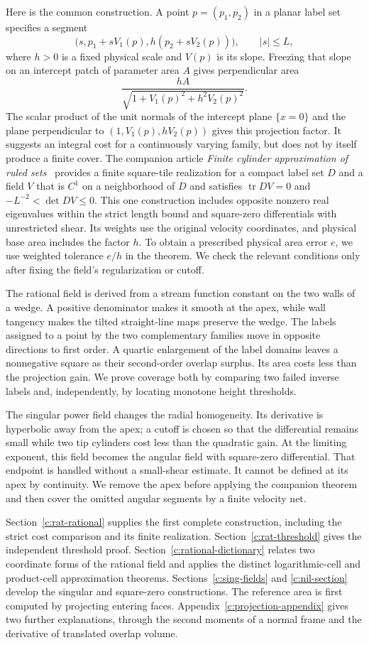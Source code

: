 Here is the common construction. A point $p=(p_1,p_2)$ in a planar
label set specifies a segment
\[
 \bigl(s,p_1+sV_1(p),h(p_2+sV_2(p))\bigr),\qquad |s|\le L,
\]
where $h>0$ is a fixed physical scale and $V(p)$ is its slope.
Freezing that slope on an intercept patch of parameter area $A$
gives perpendicular area
\[
 \frac{hA}{\sqrt{1+V_1(p)^2+h^2V_2(p)^2}}.
\]
The scalar product of the unit normals of the intercept plane
$\{x=0\}$ and the plane perpendicular to $(1,V_1(p),hV_2(p))$
gives this projection factor. It suggests an integral cost for a continuously
varying family, but does not by itself produce a finite cover.
The companion article \emph{Finite cylinder approximation of ruled
sets}~\cite[Theorem~1.2]{RuledApproximation2026} provides a finite
square-tile realization for a compact label set $D$ and a field $V$
that is $C^1$ on a neighborhood of $D$ and satisfies
$\operatorname{tr}DV=0$ and $-L^{-2}<\det DV\le0$.
This one construction includes opposite nonzero real eigenvalues
within the strict length bound and square-zero differentials with
unrestricted shear. Its weights use the original velocity coordinates,
and physical base area includes the factor $h$. To obtain a prescribed
physical area error $e$, we use weighted tolerance $e/h$ in the theorem.
We check the relevant conditions only after fixing the field's
regularization or cutoff.

The rational field is derived from a stream function constant on the
two walls of a wedge. A positive denominator makes it smooth at the
apex, while wall tangency makes the tilted straight-line maps preserve
the wedge. The labels assigned to a point by the two complementary
families move in opposite directions to first order. A quartic
enlargement of the label domains leaves a nonnegative square as their
second-order overlap surplus. Its area costs less than the projection
gain. We prove coverage both by comparing two failed inverse labels
and, independently, by locating monotone height thresholds.

The singular power field changes the radial homogeneity. Its derivative
is hyperbolic away from the apex; a cutoff is chosen so that the
differential remains small while two tip cylinders cost less than the
quadratic gain. At the limiting exponent, this field becomes the angular
field with square-zero differential. That endpoint is handled without
a small-shear estimate. It cannot be defined at its apex
by continuity. We remove the apex before applying the companion
theorem and then cover the omitted angular segments by a finite
velocity net.

Section~\ref{c:rat-rational} supplies the first complete construction,
including the strict cost comparison and its finite realization.
Section~\ref{c:rat-threshold} gives the independent threshold proof.
Section~\ref{c:rational-dictionary} relates two coordinate forms of the
rational field and applies the distinct logarithmic-cell and product-cell
approximation theorems. Sections~\ref{c:sing-fields} and
\ref{c:nil-section} develop the singular and square-zero constructions.
The reference area is first computed by projecting entering faces.
Appendix~\ref{c:projection-appendix} gives two further explanations,
through the second moments of a normal frame and the derivative of
translated overlap volume.
